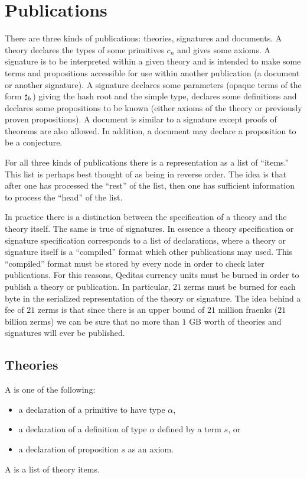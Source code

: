 \section{Publications}

There are three kinds of publications: theories, signatures and documents.
A theory declares the types of some primitives $c_n$ and gives some axioms.
A signature is to be interpreted within a given theory
and is intended to make some terms and propositions accessible for use within
another publication (a document or another signature).
A signature declares some parameters (opaque terms of the form $\mathbf{\sharp}_{h}$) giving
the hash root and the simple type,
declares some definitions
and declares some propositions to be known (either axioms of the theory or previously
proven propositions).
A document is similar to a signature except proofs of theorems are also allowed.
In addition, a document may declare a proposition to be a conjecture.

For all three kinds of publications there is a representation as a list of ``items.''
This list is perhaps best thought of as being in reverse order.
The idea is that after one has processed the ``rest'' of the list, then one
has sufficient information to process the ``head'' of the list.

In practice there is a distinction between the specification of a theory
and the theory itself. The same is true of signatures.
In essence a theory specification or signature specification corresponds to a list
of declarations, where a theory or signature itself is a ``compiled'' format which
other publications may used. This ``compiled'' format must be stored by
every node in order to check later publications. For this reasons,
Qeditas currency units must be burned in order to publish a theory or publication.
In particular, $21$ zerms must be burned for each byte in the serialized representation
of the theory or signature. The idea behind a fee of $21$ zerms is that since there
is an upper bound of $21$ million fraenks ($21$ billion zerms) we can be sure that
no more than $1$ GB worth of theories and signatures will ever be published.

\subsection{Theories}

A {} is one of the following:
\begin{itemize}
\item a declaration of a primitive to have type $\alpha$,
\item a declaration of a definition of type $\alpha$ defined by a term $s$, or
\item a declaration of proposition $s$ as an axiom.
\end{itemize}
A {} is a list of theory items.

